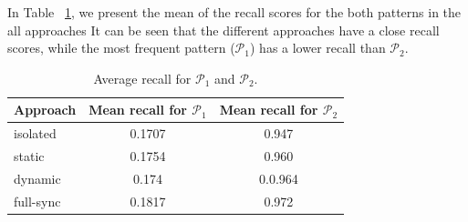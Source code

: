 \par In Table ~\ref{tab:recall}, we present the mean of the recall scores for the both patterns in the all approaches It can be seen that the different approaches have a close recall scores, while the most frequent pattern ($\mathcal{P}_1$) has a lower recall than $\mathcal{P}_2$.

\begin{table}[h]
	\caption{Average recall for  $\mathcal{P}_1$ and $\mathcal{P}_2$.}
	\label{tab:recall}
	\begin{tabular}{lcc}
		\toprule
		Approach &Mean recall for $\mathcal{P}_1$ &Mean recall for $\mathcal{P}_2$\\
		\midrule
		isolated & 0.1707  &0.947 \\
		static & 0.1754  &  0.960 \\
		dynamic & 0.174  & 0.0.964 \\
		full-sync & 0.1817  & 0.972 \\
		\bottomrule
	\end{tabular}
\end{table}


 

